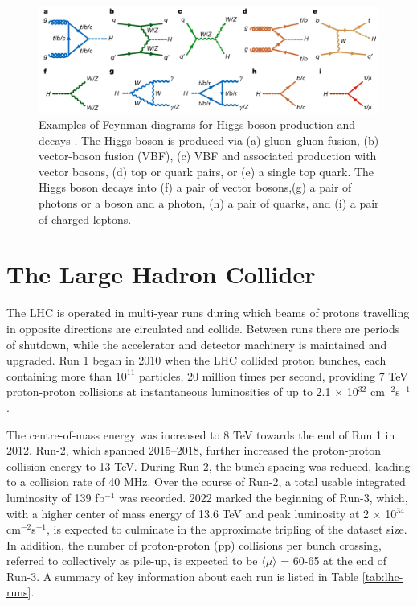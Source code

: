 \begin{figure}[htb!]
\includegraphics[width=\textwidth]{images/2-LHC-ATLAS/higgs.png}
\caption{Examples of Feynman diagrams for Higgs boson production and decays \cite{ATLAS:2022vkf}. The Higgs boson is produced via (a) gluon–gluon fusion, (b) vector-boson fusion (VBF), (c) VBF and associated production with vector bosons, (d) top or quark pairs, or (e) a single top quark. The Higgs boson decays into (f) a pair of vector bosons,(g)  a pair of photons or a boson and a photon, (h) a pair of quarks, and (i) a pair of charged leptons.}
\label{fig: higgs}
\end{figure}






\section{The Large Hadron Collider}
\label{the-lhc}
The \ac{LHC} is operated in multi-year runs during which beams of protons travelling in opposite directions are circulated and collide. Between runs there are periods of shutdown, while the accelerator and detector machinery is maintained and upgraded. Run 1 began in 2010 when the \ac{LHC} collided proton bunches, each containing more than $10^{11}$ particles, 20 million times per second, providing 7 TeV proton-proton collisions at instantaneous luminosities of up to 2.1 $\times$ 10$^{32}$ cm$^{−2}$s$^{−1}$.

The centre-of-mass energy was increased to 8 TeV towards the end of Run 1 in 2012. Run-2, which spanned 2015–2018, further increased the proton-proton collision energy to 13 TeV. During Run-2, the bunch spacing was reduced, leading to a collision rate of 40 MHz. Over the course of Run-2, a total usable integrated luminosity of 139 fb$^{−1}$ was recorded. 2022 marked the beginning of Run-3, which, with a higher center of mass energy of 13.6 TeV and peak luminosity at 2 $\times$ 10$^{34}$ cm$^{−2}$s$^{−1}$, is expected to culminate in the approximate tripling of the dataset size. In addition, the number of proton-proton (pp) collisions per bunch crossing, referred to collectively as pile-up, is expected to be $\langle \mu \rangle$ = 60-65 at the end of Run-3. A summary of key information about each run is listed in Table \ref{tab:lhc-runs}.

